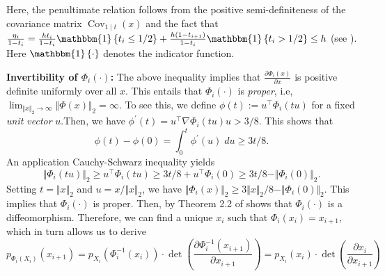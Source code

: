 \documentclass{article}
\theoremstyle{plain}
\theoremstyle{definition}
\theoremstyle{remark}
\def\Norm#1{\Vert#1\Vert}
\def\ind{{\mathbbm{1}}}
\newcommand{\bc}[1]{\left\{{#1}\right\}}
\begin{document}
Here, the penultimate relation follows from the positive semi-definiteness of the covariance matrix $\operatorname{Cov}_{1 \mid t}(x)$ and the fact that $\frac{\eta_i}{1 - t_i} = \frac{h t_i}{1 - t_i} \ind\bc{t_i \le 1/2} + \frac{h(1-t_{i+1})}{1 - t_i} \ind\bc{t_i>1/2} \le h$ (see ). Here $\ind \bc{\cdot}$ denotes the indicator function.

\textbf{Invertibility of $\Phi_i(\cdot)$:} The above inequality implies that $\frac{\partial {\Phi}_{i}(x)}{\partial x}$ is positive definite uniformly over all $x$. This entails that $\Phi_i(\cdot)$ is \textit{proper}, i.e, $\lim_{\Norm{x}_2 \to \infty} \Norm{\Phi(x)}_2 = \infty$. To see this, we define $\phi(t):=  u^\top \Phi_i(t u)$ for a fixed \textit{unit vector} $u$.Then, we have $\phi^\prime(t) = u^\top \nabla \Phi_i(t u) u > 3/8$. This shows that 
\[
\phi(t) - \phi(0) = \int_{0}^t \phi^\prime(u) \; du  \ge 3t/8.
\]
An application Cauchy-Schwarz inequality yields
\[
\Norm{\Phi_i(tu)}_2 \ge u^\top \Phi_i(t u) \ge 3t/8 + u^\top \Phi_i(0) \ge 3t/8 - \Norm{\Phi_i(0)}_2.
\]
Setting $t = \Norm{x}_2$ and $u = x/\Norm{x}_2$, we have $\Norm{\Phi_i(x)}_2 \ge 3\Norm{x}_2/8 - \Norm{\Phi_i(0)}_2$. This implies that $\Phi_i(\cdot)$ is proper. Then, by Theorem 2.2 of \citet{ruzhansky2015global} shows that $\Phi_i(\cdot)$ is a diffeomorphism.
Therefore, we can find a unique $x_{i} $ such that ${\Phi}_{i}\left(x_{i}\right)=x_{i+1}$, which in turn allows us to derive
$$
p_{{\Phi}_{i}\left(X_{i}\right)}\left(x_{i+1}\right)=p_{X_{i}}\left({\Phi}_{i}^{-1}\left(x_{i}\right)\right) \cdot \operatorname{det}\left(\frac{\partial {\Phi}_{i}^{-1}\left(x_{i+1}\right)}{\partial x_{i+1}}\right)=p_{X_{i}}\left(x_{i}\right) \cdot \operatorname{det}\left(\frac{\partial x_{i}}{\partial x_{i+1}}\right)
$$
\end{document}

